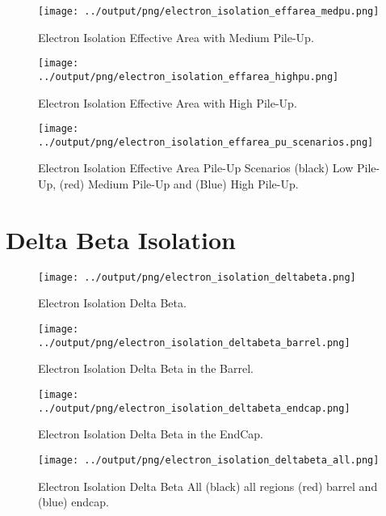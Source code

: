 \documentclass[11pt]{book}
\begin{document}
\begin{figure}[htbp]
\centering
\texttt{[image: ../output/png/electron\_isolation\_effarea\_medpu.png]}
\caption{Electron Isolation Effective Area with Medium Pile-Up.}
\label{fig:electron_isolation_effarea_medpu}
\end{figure}

\begin{figure}[htbp]
\centering
\texttt{[image: ../output/png/electron\_isolation\_effarea\_highpu.png]}
\caption{Electron Isolation Effective Area with High Pile-Up.}
\label{fig:electron_isolation_effarea_highpu}
\end{figure}

\begin{figure}[htbp]
\centering
\texttt{[image: ../output/png/electron\_isolation\_effarea\_pu\_scenarios.png]}
\caption{Electron Isolation Effective Area Pile-Up Scenarios (black) Low Pile-Up, (red) Medium Pile-Up and (Blue) High Pile-Up.}
\label{fig:electron_isolation_effarea_pu_scenarios}
\end{figure}
\clearpage

\chapter{Delta Beta Isolation}
\begin{figure}[ht]
\centering
\texttt{[image: ../output/png/electron\_isolation\_deltabeta.png]}
\caption{Electron Isolation Delta Beta.}
\label{fig:electron_isolation_deltabeta}
\end{figure}

\begin{figure}[ht]
\centering
\texttt{[image: ../output/png/electron\_isolation\_deltabeta\_barrel.png]}
\caption{Electron Isolation Delta Beta in the Barrel.}
\label{fig:electron_isolation_deltabeta_barrel}
\end{figure}

\begin{figure}[ht]
\centering
\texttt{[image: ../output/png/electron\_isolation\_deltabeta\_endcap.png]}
\caption{Electron Isolation Delta Beta in the EndCap.}
\label{fig:electron_isolation_deltabeta_endcap}
\end{figure}


\begin{figure}[ht]
\centering
\texttt{[image: ../output/png/electron\_isolation\_deltabeta\_all.png]}
\caption{Electron Isolation Delta Beta All (black) all regions (red) barrel and (blue) endcap.}
\label{fig:electron_isolation_deltabeta_all}
\end{figure}
\end{document}
